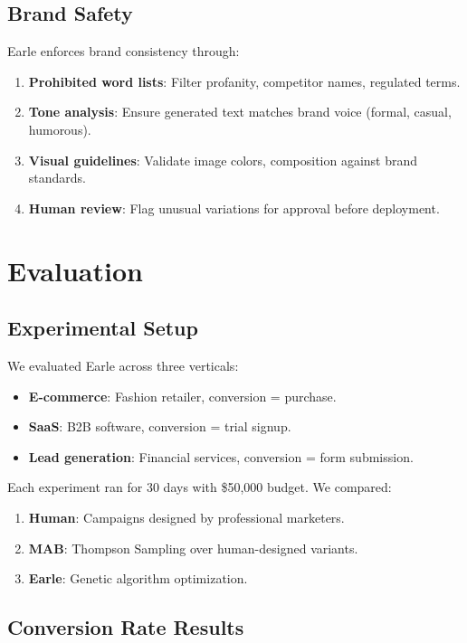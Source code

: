 \documentclass[11pt,twocolumn]{article}
\begin{document}
\subsection{Brand Safety}

Earle enforces brand consistency through:

\begin{enumerate}
\item \textbf{Prohibited word lists}: Filter profanity, competitor names, regulated terms.
\item \textbf{Tone analysis}: Ensure generated text matches brand voice (formal, casual, humorous).
\item \textbf{Visual guidelines}: Validate image colors, composition against brand standards.
\item \textbf{Human review}: Flag unusual variations for approval before deployment.
\end{enumerate}

\section{Evaluation}

\subsection{Experimental Setup}

We evaluated Earle across three verticals:

\begin{itemize}
\item \textbf{E-commerce}: Fashion retailer, conversion = purchase.
\item \textbf{SaaS}: B2B software, conversion = trial signup.
\item \textbf{Lead generation}: Financial services, conversion = form submission.
\end{itemize}

Each experiment ran for 30 days with \$50,000 budget. We compared:

\begin{enumerate}
\item \textbf{Human}: Campaigns designed by professional marketers.
\item \textbf{MAB}: Thompson Sampling over human-designed variants.
\item \textbf{Earle}: Genetic algorithm optimization.
\end{enumerate}

\subsection{Conversion Rate Results}
\end{document}
